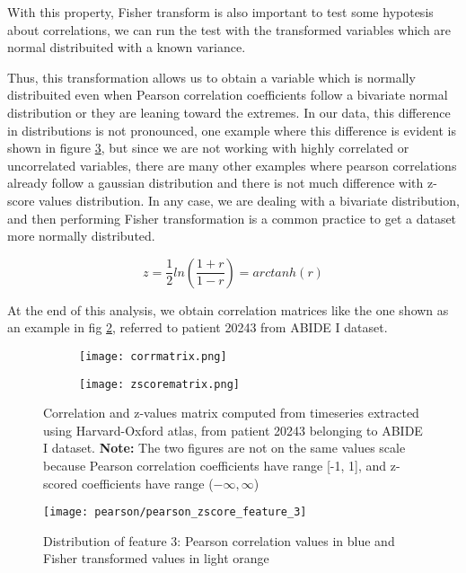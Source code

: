 \documentclass[11pt]{report}
\begin{document}
With this property, Fisher transform is also important to test some hypotesis about correlations, we can run the test with the transformed variables which are normal distribuited with a known variance.

Thus, this transformation allows us to obtain a variable which is normally distribuited even when Pearson correlation coefficients follow a bivariate normal distribution or they are leaning toward the extremes.
In our data, this difference in distributions is not pronounced, one example where this difference is evident is shown in figure \ref{fig:pearson_zscore_distribution_3}, but since we are not working with highly correlated or uncorrelated variables, there are many other examples where pearson correlations already follow a gaussian distribution and there is not much difference with z-score values distribution.
In any case, we are dealing with a bivariate distribution, and then performing Fisher transformation is a common practice to get a dataset more normally distributed.

\begin{equation}
z = \frac{1}{2}ln\left(\frac{1+r}{1-r}\right) = arctanh(r)
\end{equation}

At the end of this analysis, we obtain correlation matrices like the one shown as an example in fig \ref{fig:corrmatrices}, referred to patient 20243 from ABIDE I dataset.
\begin{figure}
\begin{subfigure}{0.5\textwidth}
\texttt{[image: corrmatrix.png]}
\caption{}
\label{ref:corrmatrix}
\end{subfigure}
\begin{subfigure}{0.5\textwidth}
\texttt{[image: zscorematrix.png]}
\end{subfigure}
\caption{Correlation and z-values matrix computed from timeseries extracted using Harvard-Oxford atlas, from patient 20243 belonging to ABIDE I dataset. \textbf{Note:} The two figures are not on the same values scale because Pearson correlation coefficients have range [-1, 1], and z-scored coefficients have range ($-\infty,\infty$)}
\label{fig:corrmatrices}
\end{figure}


\begin{figure}[h!]
\centering
\texttt{[image: pearson/pearson\_zscore\_feature\_3]}
\caption{Distribution of feature 3: Pearson correlation values in blue and Fisher transformed values in light orange}
\label{fig:pearson_zscore_distribution_3}
\end{figure}
\end{document}
